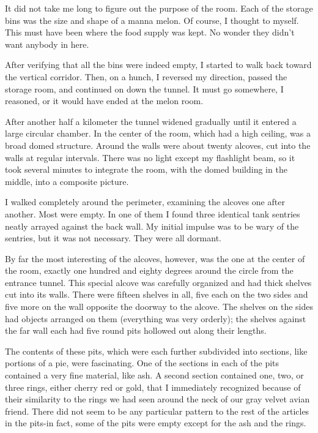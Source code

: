 \documentclass[]{article}
\begin{document}
It did not take me long to figure out the purpose of the room. Each of the storage bins was the size and shape of a manna melon. Of course, I thought to myself. This must have been where the food supply was kept. No wonder they didn’t want anybody in here.

After verifying that all the bins were indeed empty, I started to walk back toward the vertical corridor. Then, on a hunch, I reversed my direction, passed the storage room, and continued on down the tunnel. It must go somewhere, I reasoned, or it would have ended at the melon room.

After another half a kilometer the tunnel widened gradually until it entered a large circular chamber. In the center of the room, which had a high ceiling, was a broad domed structure. Around the walls were about twenty alcoves, cut into the walls at regular intervals. There was no light except my flashlight beam, so it took several minutes to integrate the room, with the domed building in the middle, into a composite picture.

I walked completely around the perimeter, examining the alcoves one after another. Most were empty. In one of them I found three identical tank sentries neatly arrayed against the back wall. My initial impulse was to be wary of the sentries, but it was not necessary. They were all dormant.

By far the most interesting of the alcoves, however, was the one at the center of the room, exactly one hundred and eighty degrees around the circle from the entrance tunnel. This special alcove was carefully organized and had thick shelves cut into its walls. There were fifteen shelves in all, five each on the two sides and five more on the wall opposite the doorway to the alcove. The shelves on the sides had objects arranged on them (everything was very orderly); the shelves against the far wall each had five round pits hollowed out along their lengths.

The contents of these pits, which were each further subdivided into sections, like portions of a pie, were fascinating. One of the sections in each of the pits contained a very fine material, like ash. A second section contained one, two, or three rings, either cherry red or gold, that I immediately recognized because of their similarity to the rings we had seen around the neck of our gray velvet avian friend. There did not seem to be any particular pattern to the rest of the articles in the pits-in fact, some of the pits were empty except for the ash and the rings.
\end{document}

